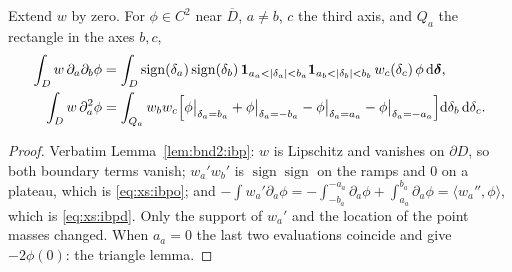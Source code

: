 \begin{lemma}
\label{lem:xs:ibp}
Extend $w$ by zero. For $\phi\in C^2$ near $\overline{D}$, $a\ne b$, $c$ the third axis, and $Q_a$
the rectangle in the axes $b,c$,
\begin{align}
\int_D w\,\partial_a\partial_b\phi &= \int_D\operatorname{sign}(\delta_a)\operatorname{sign}(\delta_b)\,
\mathbf{1}_{a_a<|\delta_a|<b_a}\mathbf{1}_{a_b<|\delta_b|<b_b}\,w_c(\delta_c)\,\phi\,\dd\boldsymbol{\delta},
\label{eq:xs:ibpo}\\
\int_D w\,\partial_a^2\phi &= \int_{Q_a}w_bw_c\Bigl[\phi\big|_{\delta_a=b_a}+\phi\big|_{\delta_a=-b_a}
-\phi\big|_{\delta_a=a_a}-\phi\big|_{\delta_a=-a_a}\Bigr]\dd\delta_b\,\dd\delta_c .
\label{eq:xs:ibpd}
\end{align}
\end{lemma}
\begin{proof}
Verbatim Lemma~\ref{lem:bnd2:ibp}: $w$ is Lipschitz and vanishes on $\partial D$, so both
boundary terms vanish; $w_a'w_b'$ is $\operatorname{sign}\operatorname{sign}$ on the ramps
and $0$ on a plateau, which is \eqref{eq:xs:ibpo}; and
$-\int w_a'\partial_a\phi = -\int_{-b_a}^{-a_a}\partial_a\phi+\int_{a_a}^{b_a}\partial_a\phi
= \langle w_a'',\phi\rangle$, which is \eqref{eq:xs:ibpd}. Only the support of $w_a'$ and the
location of the point masses changed. When $a_a = 0$ the last two evaluations coincide and
give $-2\phi(0)$: the triangle lemma.
\end{proof}

